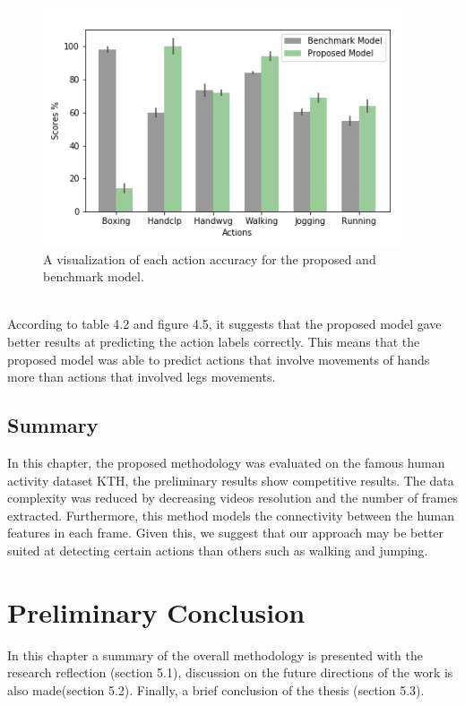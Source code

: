 \begin{figure}[ht]
    \centering
    \includegraphics{Figures/modelcomparison.png}
    \decoRule
    \caption [A visualization of each action accuracy for the proposed and benchmark model.]{A visualization of each action accuracy for the proposed and benchmark model.}
    \label{fig:la}
    \end{figure}\\
    \newpage
    According to table 4.2 and figure 4.5, it suggests that the proposed model gave better results at predicting the action labels correctly. This means that the proposed model was able to predict actions that involve movements of hands more than actions that involved legs movements.
   

\subsection{Summary}
\hspace{5mm} In this chapter, the proposed methodology was evaluated on the famous human activity dataset KTH, the preliminary results show competitive results. The data complexity was reduced by decreasing videos resolution and the number of frames extracted. Furthermore, this method models the connectivity between the human features in each frame. Given this, we suggest that our approach may be better suited at detecting certain actions than others such as walking and jumping.
\section{Preliminary Conclusion}
\hspace{5mm} In this chapter a summary of the overall methodology is presented with the research reflection (section 5.1), discussion on the future directions of the work is also made(section 5.2). Finally, a brief conclusion of the thesis (section 5.3).
